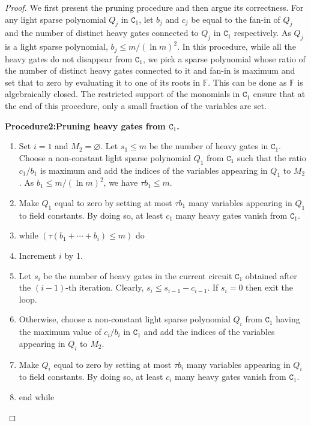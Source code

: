 \documentclass[10pt,a4paper]{article}
\newenvironment{authorclaim}[1]{\par\medskip\noindent\textbf{#1.}\ \ignorespaces}{\par\medskip}
\begin{document}
\begin{proof}
We first present the pruning procedure and then argue its correctness. For any light sparse polynomial $Q_j$ in $\mathtt C_1$, let $b_j$ and $c_j$ be equal to the fan-in of $Q_j$ and the number of distinct heavy gates connected to $Q_j$ in $\mathtt C_1$ respectively. As $Q_j$ is a light sparse polynomial, $b_j\le m/(\ln m)^2$. In this procedure, while all the heavy gates do not disappear from $\mathtt C_1$, we pick a sparse polynomial whose ratio of the number of distinct heavy gates connected to it and fan-in is maximum and set that to zero by evaluating it to one of its roots in $\mathbb F$. This can be done as $\mathbb F$ is algebraically closed. The restricted support of the monomials in $\mathtt C_1$ ensure that at the end of this procedure, only a small fraction of the variables are set.
\begin{authorclaim}{Procedure2:Pruning heavy gates from $\mathtt C_1$}
\begin{enumerate}
\item Set $i=1$ and $M_2=\varnothing$. Let $s_1\le m$ be the number of heavy gates in $\mathtt C_1$. Choose a non-constant light sparse polynomial $Q_1$ from $\mathtt C_1$ such that the ratio $c_1/b_1$ is maximum and add the indices of the variables appearing in $Q_1$ to $M_2$. As $b_1\le m/(\ln m)^2$, we have $\tau b_1\le m$.
\item Make $Q_1$ equal to zero by setting at most $\tau b_1$ many variables appearing in $Q_1$ to field constants. By doing so, at least $c_1$ many heavy gates vanish from $\mathtt C_1$.
\item while $(\tau(b_1+\cdots+b_i)\le m)$ do
\item Increment $i$ by 1.
\item Let $s_i$ be the number of heavy gates in the current circuit $\mathtt C_1$ obtained after the $(i-1)$-th iteration. Clearly, $s_i\le s_{i-1}-c_{i-1}$. If $s_i=0$ then exit the loop.
\item Otherwise, choose a non-constant light sparse polynomial $Q_i$ from $\mathtt C_1$ having the maximum value of $c_i/b_i$ in $\mathtt C_1$ and add the indices of the variables appearing in $Q_i$ to $M_2$.
\item Make $Q_i$ equal to zero by setting at most $\tau b_i$ many variables appearing in $Q_i$ to field constants. By doing so, at least $c_i$ many heavy gates vanish from $\mathtt C_1$.
\item end while
\end{enumerate}
\end{authorclaim}

\end{proof}
\end{document}
